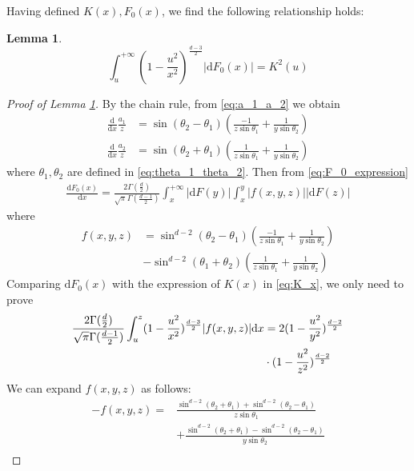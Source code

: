 \documentclass[conference,a4paper]{IEEEtran}
\def\dd{\mathrm{d}}
\newtheorem{lemma}{Lemma}
\begin{document}
Having defined $K(x), F_0(x)$, we find the following relationship holds:
\begin{lemma}\label{lem:K_F_relationship}
\begin{equation}\label{eq:F_0_integration}
     \int_u^{+\infty}
     (1-\frac{u^2}{x^2})^{\frac{d-3}{2}} |\dd F_0(x)| = K^2(u)
\end{equation}
\end{lemma}
\begin{proof}[Proof of Lemma \ref{lem:K_F_relationship}]
     By the chain rule, from \eqref{eq:a_1_a_2} we obtain
\begin{align*}
    \frac{\dd }{\dd x}\frac{a_1}{z} &
    = \sin(\theta_2 - \theta_1)
    \left(\frac{-1}{z\sin\theta_1}
    +\frac{1}{y\sin \theta_2}\right)\\
    \frac{\dd }{\dd x}\frac{a_2}{z} &
    = \sin(\theta_2 + \theta_1)
    \left(\frac{1}{z\sin\theta_1}
    +\frac{1}{y\sin \theta_2}\right)
\end{align*}
where $\theta_1, \theta_2$ are defined in \eqref{eq:theta_1_theta_2}.
Then from \eqref{eq:F_0_expression}
\begin{align*}
    \frac{\dd F_0(x)}{\dd x}  =\frac{2\Gamma(\frac{d}{2})}
    {\sqrt{\pi}\Gamma(\frac{d-1}{2})}
    \int_x^{+\infty} |\dd F(y)| \int_x^y |f(x,y,z)| |\dd F(z)| 
\end{align*}
where
\begin{align*}
    f(x,y,z) &= \sin^{d-2} (\theta_2 - \theta_1)
    \left(\frac{-1}{z\sin\theta_1}
    +\frac{1}{y\sin \theta_2}\right) \\
    &- \sin^{d-2}(\theta_1 + \theta_2)
    \left(\frac{1}{z\sin\theta_1}
    +\frac{1}{y\sin \theta_2}\right)
\end{align*}
Comparing $\dd F_0(x)$
with the expression of $K(x)$ in
\eqref{eq:K_x},
we only need to prove
\begin{align}
    \frac{2\Gamma(\frac{d}{2})}
    {\sqrt{\pi}\Gamma(\frac{d-1}{2})}
    \int_u^z (1-\frac{u^2}{x^2})^{\frac{d-3}{2}}
    |f(x,y,z)|\dd x &=
    2(1-\frac{u^2}{y^2})^{\frac{d-2}{2}} \notag\\
    &\cdot (1-\frac{u^2}{z^2})^{\frac{d-2}{2}}
    \label{eq:ref_prove_integration}    
\end{align}
We can expand $f(x,y,z)$ as follows:
\begin{align*}
-f(x,y,z)=&\frac{\sin^{d-2}(\theta_2+\theta_1)
+ \sin^{d-2}(\theta_2 - \theta_1)}{z\sin\theta_1}\\
&+\frac{\sin^{d-2}(\theta_2+\theta_1)
- \sin^{d-2}(\theta_2 - \theta_1)}{y\sin\theta_2} \\

\end{align*}
\end{proof}
\end{document}
